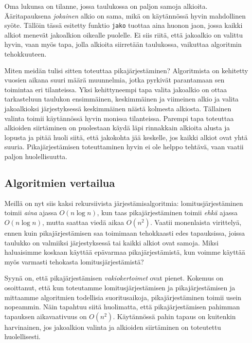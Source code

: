 Oma lukunsa on tilanne, jossa taulukossa on paljon samoja alkioita.
Ääritapauksena \emph{jokainen} alkio on sama,
mikä on käytännössä hyvin mahdollinen syöte.
Tällöin tässä esitetty funktio \texttt{jako} tuottaa aina huonon jaon,
jossa kaikki alkiot menevät jakoalkion oikealle puolelle.
Ei siis riitä, että jakoalkio on valittu hyvin,
vaan myös tapa, jolla alkioita siirretään taulukossa,
vaikuttaa algoritmin tehokkuuteen.

Miten meidän tulisi sitten toteuttaa pikajärjestäminen?
Algoritmista on kehitetty vuosien aikana suuri määrä muunnelmia,
jotka pyrkivät parantamaan sen toimintaa eri tilanteissa.
Yksi kehittyneempi tapa valita jakoalkio on ottaa tarkasteluun
taulukon ensimmäinen, keskimmäinen ja viimeinen alkio ja valita
jakoalkioksi järjestyksessä keskimmäinen näistä kolmesta alkiosta.
Tällainen valinta toimii käytännössä hyvin monissa tilanteissa.
Parempi tapa toteuttaa alkioiden siirtäminen on puolestaan
käydä läpi rinnakkain alkioita alusta ja lopusta ja
pitää huoli siitä, että jakokohta jää keskelle, jos kaikki alkiot
ovat yhtä suuria.
Pikajärjestämisen toteuttaminen hyvin ei ole helppo tehtävä,
vaan vaatii paljon huolellisuutta.

\subsection{Algoritmien vertailua}

Meillä on nyt siis kaksi rekursiivista järjestämisalgoritmia:
lomitusjärjestä\-minen toimii \emph{aina} ajassa $O(n \log n)$,
kun taas pikajärjestäminen toimii \emph{ehkä} ajassa $O(n \log n)$,
mutta saattaa viedä aikaa $O(n^2)$.
Vaatii monenlaista virittelyä,
ennen kuin pikajärjestämisen saa toimimaan tehokkaasti
edes tapauksissa, joissa taulukko on valmiiksi järjestyksessä
tai kaikki alkiot ovat samoja.
Miksi haluaisimme koskaan käyttää epävarmaa pikajärjestämistä,
kun voimme käyttää myös varmasti tehokasta lomitusjärjestämistä?


Syynä on, että pikajärjestämisen \emph{vakiokertoimet} ovat pienet.
Kokemus on osoittanut, että kun toteutamme lomitusjärjestämisen ja
pikajärjestämisen ja mittaamme algoritmien todellisia suoritusaikoja,
pikajärjestäminen toimii usein nopeammin.
Näin tapahtuu siitä huolimatta, että pikajärjestämisen pahimman
tapauksen aikavaativuus on $O(n^2)$.
Käytännössä pahin tapaus on kuitenkin harvinainen,
jos jakoalkion valinta ja alkioiden siirtäminen on toteutettu huolellisesti.

